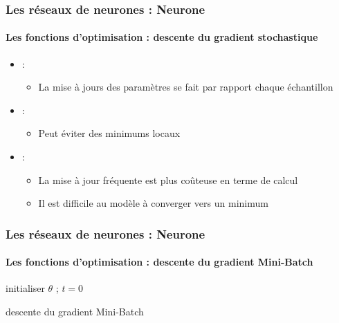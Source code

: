 \documentclass[xcolor=table]{beamer}
\begin{document}
\begin{frame}
\frametitle{Les réseaux de neurones : Neurone}
\framesubtitle{Les fonctions d'optimisation : descente du gradient stochastique}

\begin{itemize}
\item {} : 
\begin{itemize}
	\item La mise à jours des paramètres se fait par rapport chaque échantillon
\end{itemize}
\item {} : 
\begin{itemize}
	\item Peut éviter des minimums locaux
\end{itemize}
\item {} : 
\begin{itemize}
	\item La mise à jour fréquente est plus coûteuse en terme de calcul
	\item Il est difficile au modèle à converger vers un minimum
\end{itemize}
\end{itemize}

\end{frame}


\begin{frame}
\frametitle{Les réseaux de neurones : Neurone}
\framesubtitle{Les fonctions d'optimisation : descente du gradient Mini-Batch}

\begin{algorithm}[H]
	\KwResult{$ \theta $}
	initialiser $ \theta $ ; $ t = 0 $\;
	\caption{descente du gradient Mini-Batch}
\end{algorithm}

\end{frame}
\end{document}
